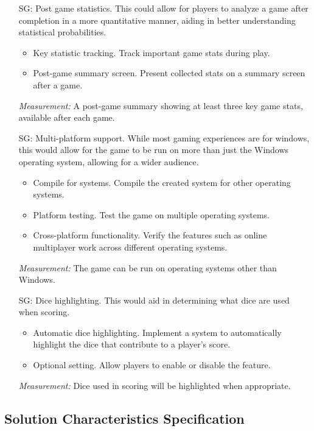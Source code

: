 \begin{itemize}
	\item[SG\refstepcounter{goalnum}\thegoalnum \label{G_stats}:] Post game statistics. This could allow for players to analyze a game after completion in a more quantitative manner, aiding in better understanding statistical probabilities.
	\begin{itemize}
        \item Key statistic tracking. Track important game stats during play.
        \item Post-game summary screen. Present collected stats on a summary screen after a game.
    \end{itemize}
	\textit{Measurement:} A post-game summary showing at least three key game stats, available after each game.
	
	\item[SG\refstepcounter{goalnum}\thegoalnum \label{G_platforms}:] Multi-platform support. While most gaming experiences are for windows, this would allow for the game to be run on more than just the Windows operating system, allowing for a wider audience.
	\begin{itemize}
        \item Compile for systems. Compile the created system for other operating systems.
        \item Platform testing. Test the game on multiple operating systems.
        \item Cross-platform functionality. Verify the features such as online multiplayer work across different operating systems.
    \end{itemize}
	\textit{Measurement:} The game can be run on operating systems other than Windows.
	
	\item[SG\refstepcounter{goalnum}\thegoalnum \label{G_highlights}:] Dice highlighting. This would aid in determining what dice are used when scoring.
	\begin{itemize}
        \item Automatic dice highlighting. Implement a system to automatically highlight the dice that contribute to a player's score.
        \item Optional setting. Allow players to enable or disable the feature.
    \end{itemize}
	\textit{Measurement:} Dice used in scoring will be highlighted when appropriate.

\end{itemize}


\subsection{Solution Characteristics Specification}

